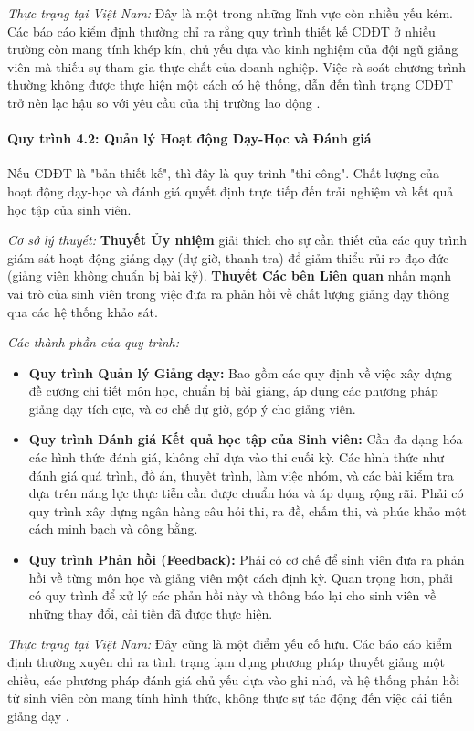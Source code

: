 \documentclass[12pt, a4paper, openany]{report}
\begin{document}
\textit{Thực trạng tại Việt Nam:} Đây là một trong những lĩnh vực còn nhiều yếu kém. Các báo cáo kiểm định thường chỉ ra rằng quy trình thiết kế CDĐT ở nhiều trường còn mang tính khép kín, chủ yếu dựa vào kinh nghiệm của đội ngũ giảng viên mà thiếu sự tham gia thực chất của doanh nghiệp. Việc rà soát chương trình thường không được thực hiện một cách có hệ thống, dẫn đến tình trạng CDĐT trở nên lạc hậu so với yêu cầu của thị trường lao động \cite{CommonFailureCriteria}.

\paragraph{Quy trình 4.2: Quản lý Hoạt động Dạy-Học và Đánh giá}
Nếu CDĐT là "bản thiết kế", thì đây là quy trình "thi công". Chất lượng của hoạt động dạy-học và đánh giá quyết định trực tiếp đến trải nghiệm và kết quả học tập của sinh viên.

\textit{Cơ sở lý thuyết:} \textbf{Thuyết Ủy nhiệm} giải thích cho sự cần thiết của các quy trình giám sát hoạt động giảng dạy (dự giờ, thanh tra) để giảm thiểu rủi ro đạo đức (giảng viên không chuẩn bị bài kỹ). \textbf{Thuyết Các bên Liên quan} nhấn mạnh vai trò của sinh viên trong việc đưa ra phản hồi về chất lượng giảng dạy thông qua các hệ thống khảo sát.

\textit{Các thành phần của quy trình:}
\begin{itemize}
    \item \textbf{Quy trình Quản lý Giảng dạy:} Bao gồm các quy định về việc xây dựng đề cương chi tiết môn học, chuẩn bị bài giảng, áp dụng các phương pháp giảng dạy tích cực, và cơ chế dự giờ, góp ý cho giảng viên.
    \item \textbf{Quy trình Đánh giá Kết quả học tập của Sinh viên:} Cần đa dạng hóa các hình thức đánh giá, không chỉ dựa vào thi cuối kỳ. Các hình thức như đánh giá quá trình, đồ án, thuyết trình, làm việc nhóm, và các bài kiểm tra dựa trên năng lực thực tiễn cần được chuẩn hóa và áp dụng rộng rãi. Phải có quy trình xây dựng ngân hàng câu hỏi thi, ra đề, chấm thi, và phúc khảo một cách minh bạch và công bằng.
    \item \textbf{Quy trình Phản hồi (Feedback):} Phải có cơ chế để sinh viên đưa ra phản hồi về từng môn học và giảng viên một cách định kỳ. Quan trọng hơn, phải có quy trình để xử lý các phản hồi này và thông báo lại cho sinh viên về những thay đổi, cải tiến đã được thực hiện.
\end{itemize}

\textit{Thực trạng tại Việt Nam:} Đây cũng là một điểm yếu cố hữu. Các báo cáo kiểm định thường xuyên chỉ ra tình trạng lạm dụng phương pháp thuyết giảng một chiều, các phương pháp đánh giá chủ yếu dựa vào ghi nhớ, và hệ thống phản hồi từ sinh viên còn mang tính hình thức, không thực sự tác động đến việc cải tiến giảng dạy \cite{ExpertPerspectivesVN, CommonFailureCriteria}.
\end{document}
